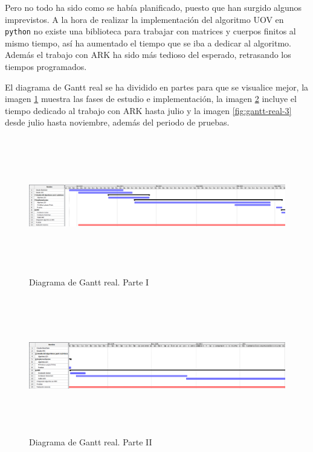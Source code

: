 Pero no todo ha sido como se había planificado, puesto que han surgido algunos imprevistos. A la hora de realizar la implementación del algoritmo UOV en \texttt{python} no existe una biblioteca para trabajar con matrices y cuerpos finitos al mismo tiempo, así ha aumentado el tiempo que se iba a dedicar al algoritmo. Además el trabajo con ARK ha sido más tedioso del esperado, retrasando los tiempos programados.

El diagrama de Gantt real se ha dividido en partes para que se visualice mejor, la imagen \ref{fig:gantt-real-1} muestra las fases de estudio e implementación, la imagen \ref{fig:gantt-real-2} incluye el tiempo dedicado al trabajo con ARK hasta julio y la imagen \ref{fig:gantt-real-3} desde julio hasta noviembre, además del periodo de pruebas.


\begin{figure}[h]
	\centering
	\includegraphics[width=15cm,height=6cm]{figuras/Gantt_1.png}
	\caption{Diagrama de Gantt real. Parte I}
	\label{fig:gantt-real-1}
\end{figure}

\begin{figure}[h]
	\centering
	\includegraphics[width=15cm,height=6cm]{figuras/Gantt_2.png}
	\caption{Diagrama de Gantt real. Parte II}
	\label{fig:gantt-real-2}
\end{figure}

